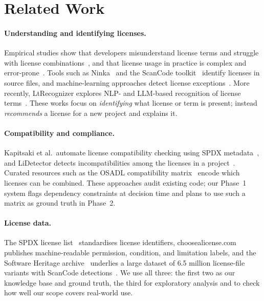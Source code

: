 \section{Related Work}
\label{s:related}

\paragraph{Understanding and identifying licenses.}
Empirical studies show that developers misunderstand license terms and struggle with license combinations~\cite{almeida2017developers}, and that license usage in practice is complex and error-prone~\cite{wu2024license}. Tools such as Ninka~\cite{german2010ninka} and the ScanCode toolkit~\cite{scancode} identify licenses in source files, and machine-learning approaches detect license exceptions~\cite{vendome2017exceptions}. More recently, LtRecognizer explores NLP- and LLM-based recognition of license terms~\cite{liu2027ltrecognizer}. These works focus on \emph{identifying} what license or term is present; \sys{} instead \emph{recommends} a license for a new project and explains it.

\paragraph{Compatibility and compliance.}
Kapitsaki et al.\ automate license compatibility checking using SPDX metadata~\cite{kapitsaki2017spdx}, and LiDetector detects incompatibilities among the licenses in a project~\cite{xu2023lidetector}. Curated resources such as the OSADL compatibility matrix~\cite{osadl} encode which licenses can be combined. These approaches audit existing code; our Phase~1 system flags dependency constraints at decision time and plans to use such a matrix as ground truth in Phase~2.

\paragraph{License data.}
The SPDX license list~\cite{spdx} standardises license identifiers, choosealicense.com~\cite{choosealicense} publishes machine-readable permission, condition, and limitation labels, and the Software Heritage archive~\cite{dicosmo2017swh} underlies a large dataset of 6.5 million license-file variants with ScanCode detections~\cite{zacchiroli2022dataset}. We use all three: the first two as our knowledge base and ground truth, the third for exploratory analysis and to check how well our scope covers real-world use.

